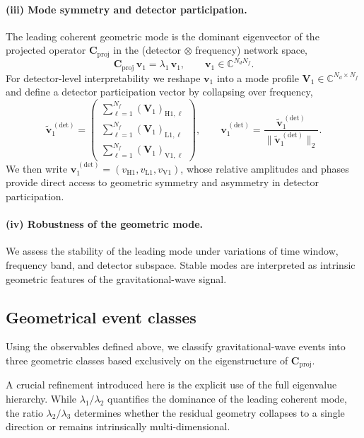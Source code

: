 \documentclass[11pt,a4paper]{article}
\begin{document}
\paragraph{(iii) Mode symmetry and detector participation.}
The leading coherent geometric mode is the dominant eigenvector of the projected operator
$\mathbf{C}_{\mathrm{proj}}$ in the (detector $\otimes$ frequency) network space,
\[
\mathbf{C}_{\mathrm{proj}}\,\mathbf{v}_1 = \lambda_1\,\mathbf{v}_1,
\qquad
\mathbf{v}_1 \in \mathbb{C}^{N_d N_f}.
\]
For detector-level interpretability we reshape $\mathbf{v}_1$ into a mode profile
$\mathbf{V}_1 \in \mathbb{C}^{N_d\times N_f}$ and define a detector participation vector by
collapsing over frequency,
\begin{equation}
\tilde{\mathbf{v}}^{\,(\mathrm{det})}_1
=
\begin{pmatrix}
\sum_{\ell=1}^{N_f} (\mathbf{V}_1)_{\mathrm{H1},\ell}\\
\sum_{\ell=1}^{N_f} (\mathbf{V}_1)_{\mathrm{L1},\ell}\\
\sum_{\ell=1}^{N_f} (\mathbf{V}_1)_{\mathrm{V1},\ell}
\end{pmatrix},
\qquad
\mathbf{v}^{\,(\mathrm{det})}_1 = \frac{\tilde{\mathbf{v}}^{\,(\mathrm{det})}_1}{\|\tilde{\mathbf{v}}^{\,(\mathrm{det})}_1\|_2}.
\end{equation}
We then write
$\mathbf{v}^{\,(\mathrm{det})}_1 = \left(v_{\mathrm{H1}}, v_{\mathrm{L1}}, v_{\mathrm{V1}}\right)$,
whose relative amplitudes and phases provide direct access to geometric symmetry and
asymmetry in detector participation.

\paragraph{(iv) Robustness of the geometric mode.}
We assess the stability of the leading mode under variations of time window, frequency
band, and detector subspace.
Stable modes are interpreted as intrinsic geometric features of the gravitational-wave
signal.

\subsection{Geometrical event classes}

Using the observables defined above, we classify gravitational-wave events into three
geometric classes based exclusively on the eigenstructure of
$\mathbf{C}_{\mathrm{proj}}$.

A crucial refinement introduced here is the explicit use of the full eigenvalue
hierarchy.
While $\lambda_1/\lambda_2$ quantifies the dominance of the leading coherent mode, the
ratio $\lambda_2/\lambda_3$ determines whether the residual geometry collapses to a single
direction or remains intrinsically multi-dimensional.
\end{document}
